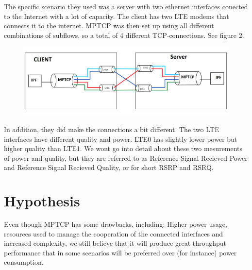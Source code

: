 \documentclass[11pt,twocolumn]{article}
\begin{document}

The specific scenario they used was a server with two ethernet interfaces conected to the Internet with a lot of capacity. The client has two LTE modems that connects it to the internet. MPTCP was then set up using all different combinations of subflows, so a total of 4 different TCP-connections. See figure 2.
 
\begin{figure}[ht]
\begin{center}
\includegraphics[scale=0.26]{Figure_1}
\end{center}
\end{figure}

In addition, they did make the connections a bit different. The two LTE interfaces have different quality and power. LTE0 has slightly lower power but higher quality than LTE1. We wont go into detail about these two mesurements of power and quality, but they are referred to as Reference Signal Recieved Power and Reference Signal Recieved Quality, or for short RSRP and RSRQ.


\section{Hypothesis}

Even though MPTCP has some drawbacks, including: Higher power usage, resources used to manage the cooperation of the connected interfaces and increased complexity, we still believe that it will produce great throughput performance that in some scenarios will be preferred over (for instance) power consumption.
\end{document}
